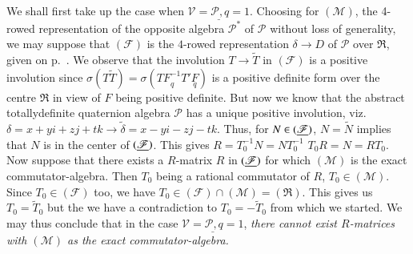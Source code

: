 We shall first take up the case when
$\underline{\mathscr{V}=\mathscr{P}, q=1}$. Choosing for
$(\mathscr{M})$, the 4-rowed representation of the opposite algebra
$\mathscr{P}^{\ast}$ of $\mathscr{P}$ without loss of generality, we
may suppose that $(\mathscr{F})$ is the $4$-rowed representation
$\delta\to D$ of $\mathscr{P}$ over $\mathfrak{R}$, given on p.~\pageref{p63}. We
observe that the involution $T\to\widetilde{T}$ in 
$(\mathscr{F})$ is a positive involution since
$\sigma(T\widetilde{T})= \sigma(T\underset{q}{F^{-1}}T'\underset{q}{F})$ is a
positive definite form over the centre $\mathfrak{R}$ in view of $F$
being positive definite. But now we know that the abstract
totally\pageoriginale definite quaternion algebra $\mathscr{P}$ has a
unique positive involution, viz. $\delta=x+yi+zj+tk\to
\widetilde{\delta}=x-yi-zj-tk$. Thus, for $N\in(\underline{\mathscr{F}})$,
$N=\widetilde{N}$ implies that $N$ is in the center of
$(\underline{\mathscr{F}})$. This gives $R=T^{-1}_{0}N=NT^{-1}_{0}$ \ie
$T_{0}R=N=RT_{0}$. Now suppose that there exists a $R$-matrix $R$ in
$(\underline{\mathscr{F}})$ for which $(\mathscr{M})$ is the exact
commutator-algebra. Then $T_{0}$ being a rational commutator of $R$,
$T_{0}\in(\mathscr{M})$. Since $T_{0}\in(\mathscr{F})$ too, we have
$T_{0}\in(\mathscr{F})\cap (\mathscr{M})=(\mathfrak{R})$. This gives
us $T_{0}=\widetilde{T}_{0}$ but the we have a contradiction to
$T_{0}=-\widetilde{T}_{0}$ from which we started. We may thus conclude
that in the case $\underline{\mathscr{V}=\mathscr{P}, q=1}$, 
{\em there cannot exist $R$-matrices with $(\mathscr{M})$ as the exact
  commutator-algebra.} 

